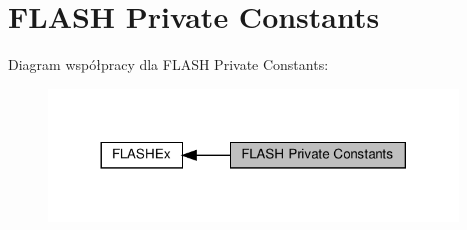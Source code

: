 \hypertarget{group___f_l_a_s_h_ex___private___constants}{}\section{F\+L\+A\+SH Private Constants}
\label{group___f_l_a_s_h_ex___private___constants}
Diagram współpracy dla F\+L\+A\+SH Private Constants\+:\nopagebreak
\begin{figure}[H]
\begin{center}
\leavevmode
\includegraphics[width=308pt]{group___f_l_a_s_h_ex___private___constants}
\end{center}
\end{figure}
